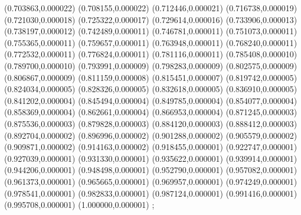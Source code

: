 {(0.703863,0.000022) (0.708155,0.000022) (0.712446,0.000021) (0.716738,0.000019) (0.721030,0.000018) (0.725322,0.000017) (0.729614,0.000016) (0.733906,0.000013) (0.738197,0.000012) (0.742489,0.000011) (0.746781,0.000011) (0.751073,0.000011) (0.755365,0.000011) (0.759657,0.000011) (0.763948,0.000011) (0.768240,0.000011) (0.772532,0.000011) (0.776824,0.000011) (0.781116,0.000011) (0.785408,0.000010) (0.789700,0.000010) (0.793991,0.000009) (0.798283,0.000009) (0.802575,0.000009) (0.806867,0.000009) (0.811159,0.000008) (0.815451,0.000007) (0.819742,0.000005) (0.824034,0.000005) (0.828326,0.000005) (0.832618,0.000005) (0.836910,0.000005) (0.841202,0.000004) (0.845494,0.000004) (0.849785,0.000004) (0.854077,0.000004) (0.858369,0.000004) (0.862661,0.000004) (0.866953,0.000004) (0.871245,0.000003) (0.875536,0.000003) (0.879828,0.000003) (0.884120,0.000003) (0.888412,0.000003) (0.892704,0.000002) (0.896996,0.000002) (0.901288,0.000002) (0.905579,0.000002) (0.909871,0.000002) (0.914163,0.000002) (0.918455,0.000001) (0.922747,0.000001) (0.927039,0.000001) (0.931330,0.000001) (0.935622,0.000001) (0.939914,0.000001) (0.944206,0.000001) (0.948498,0.000001) (0.952790,0.000001) (0.957082,0.000001) (0.961373,0.000001) (0.965665,0.000001) (0.969957,0.000001) (0.974249,0.000001) (0.978541,0.000001) (0.982833,0.000001) (0.987124,0.000001) (0.991416,0.000001) (0.995708,0.000001) (1.000000,0.000001)
};
    
